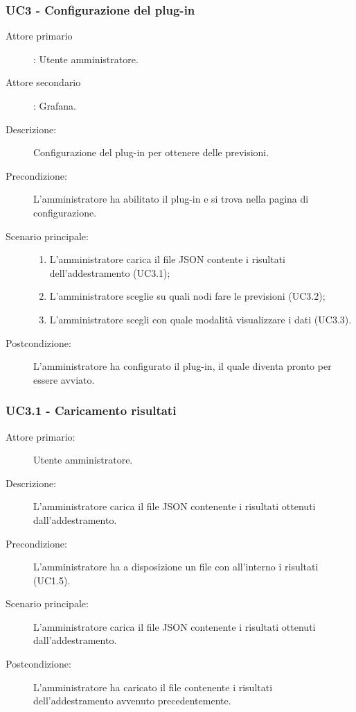 \subsubsection{UC3 - Configurazione del plug-in}
\label{sssec:uc3}
\begin{description}
  \item[Attore primario]: Utente amministratore.
  \item[Attore secondario]: Grafana.
  \item[Descrizione:] Configurazione del plug-in per ottenere delle previsioni.
  \item[Precondizione:] L'amministratore ha abilitato il plug-in e si trova nella pagina di configurazione.
  \item[Scenario principale:]
  \begin{enumerate}
    \item L'amministratore carica il file JSON contente i risultati dell'addestramento (UC3.1);
    \item L'amministratore sceglie su quali nodi fare le previsioni (UC3.2);
    \item L'amministratore scegli con quale modalità visualizzare i dati (UC3.3).
  \end{enumerate}
  \item[Postcondizione:] L'amministratore ha configurato il plug-in, il quale diventa pronto per essere avviato.
\end{description}

\subsubsection{UC3.1 - Caricamento risultati}
\label{sssec:uc3.1}
\begin{description}
  \item[Attore primario:] Utente amministratore.
  \item[Descrizione:] L'amministratore carica il file JSON contenente i risultati ottenuti dall'addestramento.
  \item[Precondizione:] L'amministratore ha a disposizione un file con all'interno i risultati (UC1.5).
  \item[Scenario principale:] L'amministratore carica il file JSON contenente i risultati ottenuti dall'addestramento.
  \item[Postcondizione:] L'amministratore ha caricato il file contenente i risultati dell'addestramento avvenuto precedentemente.
\end{description}

